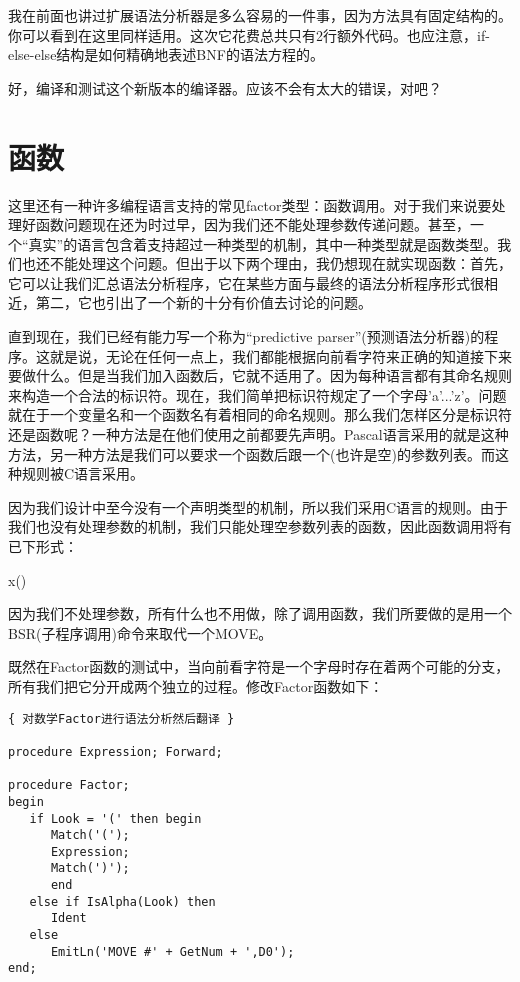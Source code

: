 我在前面也讲过扩展语法分析器是多么容易的一件事，因为方法具有固定结构的。你可以看到在这里同样适用。这次它花费总共只有2行额外代码。也应注意，if-else-else结构是如何精确地表述BNF的语法方程的。

好，编译和测试这个新版本的编译器。应该不会有太大的错误，对吧？

\section{函数}

这里还有一种许多编程语言支持的常见factor类型：函数调用。对于我们来说要处理好函数问题现在还为时过早，因为我们还不能处理参数传递问题。甚至，一个“真实”的语言包含着支持超过一种类型的机制，其中一种类型就是函数类型。我们也还不能处理这个问题。但出于以下两个理由，我仍想现在就实现函数：首先，它可以让我们汇总语法分析程序，它在某些方面与最终的语法分析程序形式很相近，第二，它也引出了一个新的十分有价值去讨论的问题。

直到现在，我们已经有能力写一个称为“predictive parser”(预测语法分析器)的程序。这就是说，无论在任何一点上，我们都能根据向前看字符来正确的知道接下来要做什么。但是当我们加入函数后，它就不适用了。因为每种语言都有其命名规则来构造一个合法的标识符。现在，我们简单把标识符规定了一个字母'a'...'z'。问题就在于一个变量名和一个函数名有着相同的命名规则。那么我们怎样区分是标识符还是函数呢？一种方法是在他们使用之前都要先声明。Pascal语言采用的就是这种方法，另一种方法是我们可以要求一个函数后跟一个(也许是空)的参数列表。而这种规则被C语言采用。

因为我们设计中至今没有一个声明类型的机制，所以我们采用C语言的规则。由于我们也没有处理参数的机制，我们只能处理空参数列表的函数，因此函数调用将有已下形式：

\begin{tcolorbox}
x()
\end{tcolorbox}

因为我们不处理参数，所有什么也不用做，除了调用函数，我们所要做的是用一个BSR(子程序调用)命令来取代一个MOVE。

既然在Factor函数的测试中，当向前看字符是一个字母时存在着两个可能的分支，所有我们把它分开成两个独立的过程。修改Factor函数如下：

\begin{verbatim}
{ 对数学Factor进行语法分析然后翻译 }

procedure Expression; Forward;

procedure Factor;
begin
   if Look = '(' then begin
      Match('(');
      Expression;
      Match(')');
      end
   else if IsAlpha(Look) then
      Ident
   else
      EmitLn('MOVE #' + GetNum + ',D0');
end;
\end{verbatim}

